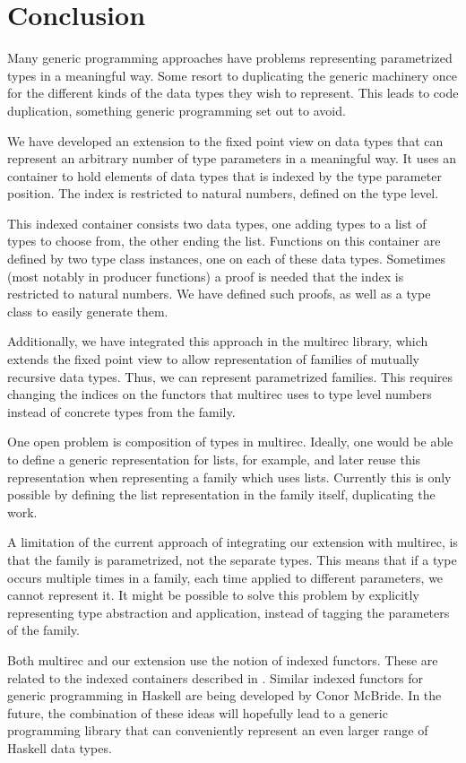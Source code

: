 \chapter{Conclusion}
\label{cha:conclusion}

Many generic programming approaches have problems representing
parametrized types in a meaningful way. Some resort to duplicating the
generic machinery once for the different kinds of the data types they
wish to represent. This leads to code duplication, something generic
programming set out to avoid.

We have developed an extension to the fixed point view on data types
that can represent an arbitrary number of type parameters in a
meaningful way. It uses an container to hold elements of data types
that is indexed by the type parameter position. The index is
restricted to natural numbers, defined on the type level.

This indexed container consists two data types, one adding types to a
list of types to choose from, the other ending the list. Functions on
this container are defined by two type class instances, one on each of
these data types. Sometimes (most notably in producer functions) a
proof is needed that the index is restricted to natural numbers. We
have defined such proofs, as well as a type class to easily generate
them.

Additionally, we have integrated this approach in the multirec
library, which extends the fixed point view to allow representation of
families of mutually recursive data types. Thus, we can represent
parametrized families. This requires changing the indices on the
functors that multirec uses to type level numbers instead of concrete
types from the family.

One open problem is composition of types in multirec. Ideally, one
would be able to define a generic representation for lists, for
example, and later reuse this representation when representing a
family which uses lists. Currently this is only possible by defining
the list representation in the family itself, duplicating the work.

A limitation of the current approach of integrating our extension with
multirec, is that the family is parametrized, not the separate types.
This means that if a type occurs multiple times in a family, each time
applied to different parameters, we cannot represent it. It might be
possible to solve this problem by explicitly representing type
abstraction and application, instead of tagging the parameters of
the family.

Both multirec and our extension use the notion of indexed functors.
These are related to the indexed containers described in
\cite{indexedcontainers}.  Similar indexed functors for generic
programming in Haskell are being developed by Conor McBride. In the
future, the combination of these ideas will hopefully lead to a
generic programming library that can conveniently represent an even
larger range of Haskell data types.
